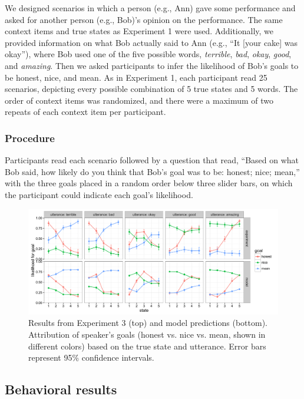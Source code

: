 \documentclass[10pt,letterpaper]{article}
\begin{document}
We designed scenarios in which a person (e.g., Ann) gave some performance and asked for another person (e.g., Bob)'s opinion on the performance. The same context items and true states as Experiment 1 were used. Additionally, we provided information on what Bob actually said to Ann (e.g., ``It [your cake] was okay''), where Bob used one of the five possible words,  \emph{terrible}, \emph{bad}, \emph{okay}, \emph{good}, and \emph{amazing}. Then we asked participants to infer the likelihood of Bob's goals to be honest, nice, and mean. As in Experiment 1, each participant read 25 scenarios, depicting every possible combination of 5 true states and 5 words.
The order of context items was randomized, and there were a maximum of two repeats of each context item per participant.

\subsubsection{Procedure}
Participants read each scenario followed by a question that read, ``Based on what Bob said, how likely do you think that Bob's goal was to be: honest; nice; mean,'' with the three goals placed in a random order below three slider bars, on which the participant could indicate each goal's likelihood.

\begin{figure}[t]
\begin{center} 
  \includegraphics[width=.9\textwidth]{figures/exp2.pdf}
  \caption{\label{fig:exp2} Results from Experiment 3 (top) and model predictions (bottom). Attribution of speaker's goals (honest vs. nice vs. mean, shown in different colors) based on the true state and utterance. Error bars represent 95\% confidence intervals.}
  \end{center} 
\end{figure}

\subsection{Behavioral results}
\end{document}
